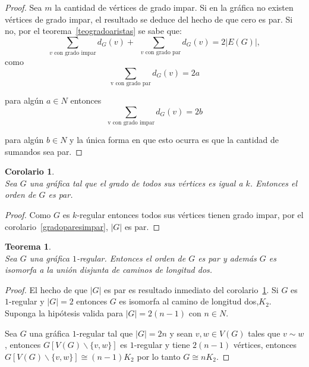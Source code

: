 \documentclass[11pt]{book}
\newtheorem{theorem}{Teorema}
\newtheorem{corollary}{Corolario}
\theoremstyle{definition}
\begin{document}
\begin{proof} Sea $m$ la cantidad de vértices de grado impar. Si en la
gráfica no existen vértices de grado impar, el resultado se deduce del
hecho de que cero es par. Si no, por el teorema~\ref{teogradoaristas}
se sabe que:
\begin{equation*}
  \sum_{\text{$v$ con grado impar}}d_G(v) + \sum_{\text { $v$ con grado par}}d_G(v)=2| E(G)|,
\end{equation*}
como \begin{equation*} \sum_{\text{v con grado par}}d_G(v)=2a
\end{equation*}

para algún $a\in N$ entonces
\begin{equation*}
  \sum_{\text {v con grado impar}}d_G(v)=2b
\end{equation*}

para algún $b\in N$ y la única forma en que esto ocurra es que la
cantidad de sumandos sea par.
\end{proof}

\begin{corollary}\textbf{}\\
  \label{cardinespar}
Sea $G$ una gráfica tal que el grado de todos sus vértices es igual a $k$. Entonces el orden de $G$ es par.
\end{corollary}

\begin{proof} Como $G$ es $k$-regular entonces todos sus vértices
tienen grado impar, por el corolario~\ref{gradoparesimpar}, $|G|$ es
par.
\end{proof}

\begin{theorem}\textbf{}\\
  Sea $G$ una gráfica $1$-regular. Entonces el orden de $G$ es par y además $G$ es isomorfa a la unión disjunta de caminos de longitud dos.
\end{theorem}

\begin{proof} El hecho de que $|G|$ es par es resultado inmediato del corolario~\ref{cardinespar}. Si $G$ es $1$-regular y $|G|=2$
entonces $G$ es isomorfa al camino de longitud dos,$K_2$. Suponga la hipótesis valida para $|G|=
2(n-1)$ con $n\in N$.

Sea $G$ una gráfica $1$-regular tal que $|G|=2n$ y sean $v,w\in V(G)$
tales que $v \sim w$, entonces $G[ V(G)\backslash\{v,w\}]$ es
$1$-regular y tiene $2(n-1)$ vértices, entonces $G[ V(G)\backslash
\{v,w\}]\cong (n-1)K_2$ por lo tanto $G\cong nK_2$.
\end{proof}
\end{document}
